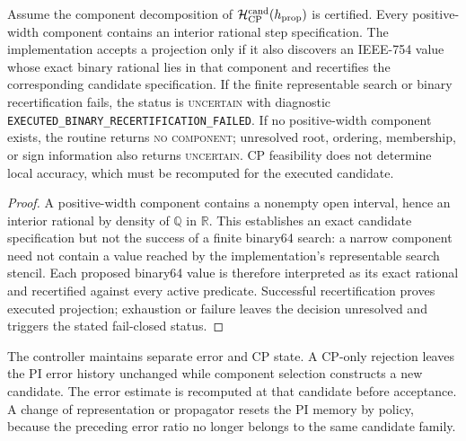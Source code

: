 \begin{proposition}
\label{prop:one_shot_projection}
Assume the component decomposition of $\mathcal H_{\rm CP}^{\rm cand}(h_{\rm prop})$ is certified. Every positive-width component contains an interior rational step specification. The implementation accepts a projection only if it also discovers an IEEE-754 value whose exact binary rational lies in that component and recertifies the corresponding candidate specification. If the finite representable search or binary recertification fails, the status is \textnormal{\textsc{uncertain}} with diagnostic \texttt{EXECUTED\_BINARY\_RECERTIFICATION\_FAILED}. If no positive-width component exists, the routine returns \textnormal{\textsc{no component}}; unresolved root, ordering, membership, or sign information also returns \textnormal{\textsc{uncertain}}. CP feasibility does not determine local accuracy, which must be recomputed for the executed candidate.
\end{proposition}

\begin{proof}
A positive-width component contains a nonempty open interval, hence an interior rational by density of $\mathbb Q$ in $\mathbb R$. This establishes an exact candidate specification but not the success of a finite binary64 search: a narrow component need not contain a value reached by the implementation's representable search stencil. Each proposed binary64 value is therefore interpreted as its exact rational and recertified against every active predicate. Successful recertification proves executed projection; exhaustion or failure leaves the decision unresolved and triggers the stated fail-closed status.
\end{proof}

The controller maintains separate error and CP state. A CP-only rejection leaves the PI error history unchanged while component selection constructs a new candidate. The error estimate is recomputed at that candidate before acceptance. A change of representation or propagator resets the PI memory by policy, because the preceding error ratio no longer belongs to the same candidate family.

